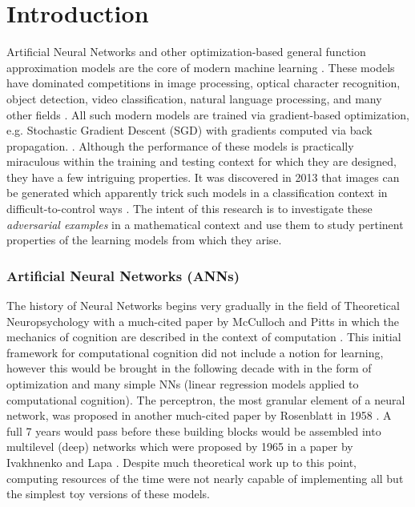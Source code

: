 \chapter{Introduction} %
\label{Chapter1} %


Artificial Neural Networks and other optimization-based general
function approximation models are the core of modern
machine learning \cite{prakash2018}. These models have dominated competitions in image processing, optical character recognition, object detection, video classification, natural language processing, and many other fields \cite{SCHMIDHUBER201585}. All such modern models are
trained via gradient-based optimization, e.g. Stochastic Gradient Descent (SGD) with
gradients computed via back propagation. \cite{goodfellow2013multidigit}. Although the performance of these models is practically
miraculous within the training and testing context for which they are designed, they have a few intriguing properties. It was discovered in 2013 
\cite{Szegedy2013} that images can be generated
which apparently trick such models in a classification context in  difficult-to-control ways \cite{Khoury2018}. The intent of this
research is to investigate these \emph{adversarial examples} in a
mathematical context and use them to study pertinent 
properties of the learning models from which they arise.

\subsection{Artificial Neural Networks (ANNs)}


The history of Neural Networks begins very gradually in the field of Theoretical
Neuropsychology with a much-cited paper by McCulloch and Pitts in
which the mechanics of cognition are described in the context of
computation \cite{mcculloch1943logical}. This initial framework for
computational cognition did not include a notion for learning, however
this would be brought in the following decade with in the form of
optimization and many simple NNs (linear regression models applied to
computational cognition). The perceptron, the most granular element of
a neural network, was proposed in another much-cited paper by
Rosenblatt in 1958 \cite{rosenblatt1958perceptron}. A full 7 years
would pass before these building blocks would be assembled into
multilevel (deep) networks which were proposed by 1965 in a paper by
Ivakhnenko and Lapa \cite{ivakhnenko1965cybernetic}. Despite much
theoretical work up to this point, computing resources of the time
were not nearly capable of implementing all but the simplest toy
versions of these models. 

